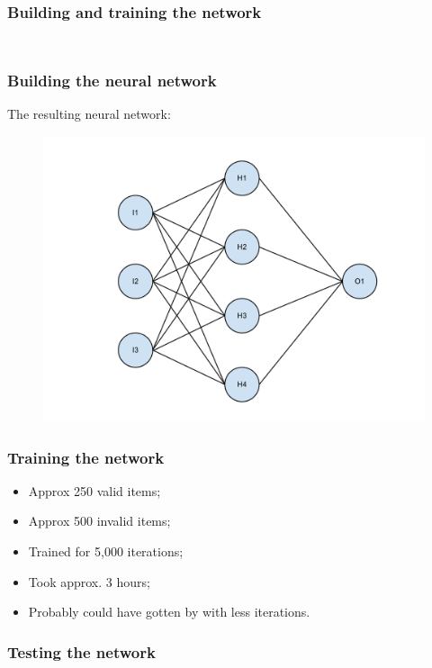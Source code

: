 \documentclass{beamer}
\begin{document}
\begin{frame}[fragile]
    \frametitle{Building and training the network}
    \inputminted[firstline=3,lastline=4,linenos,frame=lines,firstnumber=3]{python}{brain.py}
    \inputminted[firstline=29,lastline=40,linenos,frame=lines,firstnumber=29]{python}{brain.py}
\end{frame}

\begin{frame}
    \frametitle{Building the neural network}
    The resulting neural network:
    \begin{figure}
        \centering
        \includegraphics[height=0.8\paperheight]{nn.pdf}
    \end{figure}
\end{frame}

\begin{frame}
    \frametitle{Training the network}
    \begin{itemize}
        \item Approx 250 valid items;
        \item Approx 500 invalid items;
        \item Trained for 5,000 iterations;
        \item Took approx. 3 hours;
        \item Probably could have gotten by with less iterations.
    \end{itemize}
\end{frame}

\begin{frame}[fragile]
    \frametitle{Testing the network}
    \inputminted[firstline=9,lastline=10,linenos,frame=lines,firstnumber=9]{python}{brain.py}
    \inputminted[firstline=43,lastline=51,linenos,frame=lines,firstnumber=43]{python}{brain.py}
\end{frame}
\end{document}
